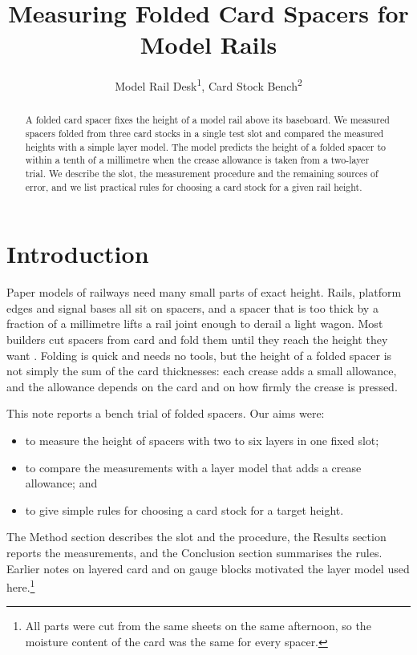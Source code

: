 \documentclass[letterpaper]{article}
\title{Measuring Folded Card Spacers for Model Rails}
\author{
    Model Rail Desk\textsuperscript{\rm 1},
    Card Stock Bench\textsuperscript{\rm 2}
}
\begin{document}
\maketitle

\begin{abstract}
A folded card spacer fixes the height of a model rail above its baseboard.
We measured spacers folded from three card stocks in a single test slot and
compared the measured heights with a simple layer model. The model predicts the
height of a folded spacer to within a tenth of a millimetre when the crease
allowance is taken from a two-layer trial. We describe the slot, the measurement
procedure and the remaining sources of error, and we list practical rules for
choosing a card stock for a given rail height.
\end{abstract}

\section{Introduction}\label{sec:intro}
Paper models of railways need many small parts of exact height. Rails,
platform edges and signal bases all sit on spacers, and a spacer that is too
thick by a fraction of a millimetre lifts a rail joint enough to derail a light
wagon. Most builders cut spacers from card and fold them until they reach the
height they want \citep{desk25}. Folding is quick and needs no tools, but the
height of a folded spacer is not simply the sum of the card thicknesses: each
crease adds a small allowance, and the allowance depends on the card and on how
firmly the crease is pressed.

This note reports a bench trial of folded spacers. Our aims were:
\begin{itemize}
\item to measure the height of spacers with two to six layers in one fixed slot;
\item to compare the measurements with a layer model that adds a crease allowance; and
\item to give simple rules for choosing a card stock for a target height.
\end{itemize}
The Method section describes the slot and the procedure, the Results section
reports the measurements, and the Conclusion section summarises the rules.
Earlier notes on layered card \citep{bench24} and on gauge blocks
\citep{scale23} motivated the layer model used here.\footnote{All parts were
cut from the same sheets on the same afternoon, so the moisture content of the
card was the same for every spacer.}
\end{document}
